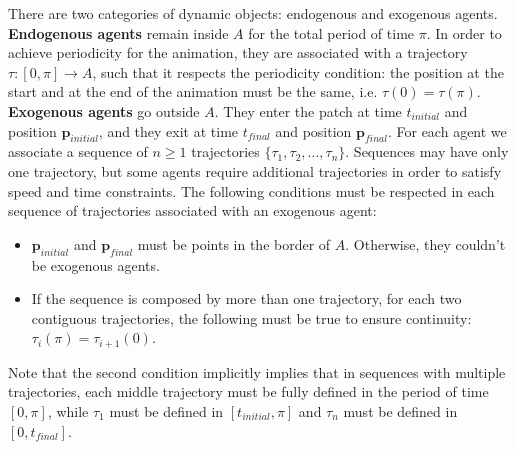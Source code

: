There are two categories of dynamic objects: endogenous and exogenous agents. {\bf Endogenous agents} remain inside $A$ for the total period of time $\pi$. In order to achieve periodicity for the animation, they are associated with a trajectory $\tau : [0,\pi] \rightarrow A$, such that it respects the periodicity condition: the position at the start and at the end of the animation must be the same, i.e. \mbox{$\tau (0) = \tau (\pi)$}.\\
{\bf Exogenous agents} go outside $A$. They enter the patch at time $t_{initial}$ and position $\mathbf{p}_{initial}$, and they exit at time $t_{final}$ and position $\mathbf{p}_{final}$. For each agent we associate a sequence of $n \ge 1$ trajectories $\{ \tau_1, \tau_2, \dots, \tau_n\}$. Sequences may have only one trajectory, but some agents require additional trajectories in order to satisfy speed and time constraints. The following conditions must be respected in each sequence of trajectories associated with an exogenous agent:

\begin{itemize}

\item{$\mathbf{p}_{initial}$ and $\mathbf{p}_{final}$ must be points in the border of $A$. Otherwise, they couldn't be exogenous agents.}

\item{If the sequence is composed by more than one trajectory, for each two contiguous trajectories, the following must be true to ensure continuity: $\tau_i(\pi) = \tau_{i+1}(0)$.}

\end{itemize}

Note that the second condition implicitly implies that in sequences with multiple trajectories, each middle trajectory must be fully defined in the period of time $[0,\pi]$, while $\tau_1$ must be defined in $[t_{initial},\pi]$ and $\tau_n$ must be defined in $[0, t_{final}]$.

